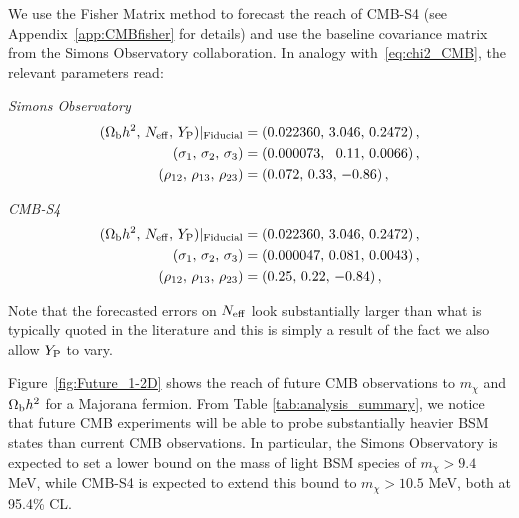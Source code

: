 \documentclass[notitlepage,letterpaper,natbib,aps,prd,onecolumn,amsmath,amsfonts,nofootinbib,preprintnumbers,superscriptaddress,secnumarabic,groupedaddress]{revtex4-1}
\begin{document}
We use the Fisher Matrix method to forecast the reach of CMB-S4 (see Appendix~\ref{app:CMBfisher} for details) and use the baseline covariance matrix from the Simons Observatory collaboration. In analogy with~\eqref{eq:chi2_CMB}, the relevant parameters read:

\begin{center}
\begin{minipage}{0.49\textwidth}
\centering \textit{Simons Observatory}
\begin{align}
(\Omega_\mathrm{b} h^2,\,N_{\rm eff},\,Y_{\rm P})|_{\rm Fiducial} &= (0.022360,\, 3.046,\, 0.2472) \, \nonumber, \\
(\sigma_{1},\,\sigma_{2},\,\sigma_{3}) &= (0.000073,\, \,\,\,0.11,\, 0.0066)\, , \nonumber \\
(\rho_{12},\,\rho_{13},\,\rho_{23}) &= (0.072,\, 0.33,\, -0.86) \, ,\nonumber
\end{align}
\end{minipage}
\begin{minipage}{0.49\textwidth}
\centering \textit{CMB-S4}
\begin{align}
(\Omega_\mathrm{b} h^2,\,N_{\rm eff},\,Y_{\rm P})|_{\rm Fiducial} &= (0.022360,\, 3.046,\, 0.2472) \, , \nonumber  \\
(\sigma_{1},\,\sigma_{2},\,\sigma_{3}) &= (0.000047,\, 0.081,\, 0.0043)\,  ,\nonumber\\ 
(\rho_{12},\,\rho_{13},\,\rho_{23}) &= (0.25,\, 0.22,\, -0.84) \, ,\nonumber
\end{align}
\end{minipage}
\end{center}

Note that the forecasted errors on $N_{\rm eff}$ look substantially larger than what is typically quoted in the literature and this is simply a result of the fact we also allow $Y_{\rm P}$ to vary.

Figure~\ref{fig:Future_1-2D} shows the reach of future CMB observations to $m_\chi$ and $\Omega_{\rm b}h^2$ for a Majorana fermion. From Table \ref{tab:analysis_summary}, we notice that future CMB experiments will be able to probe substantially heavier BSM states than current CMB observations. In particular, the Simons Observatory is expected to set a lower bound on the mass of light BSM species of $m_\chi > 9.4$ MeV, while CMB-S4 is expected to extend this bound to $m_\chi > 10.5$ MeV, both at 95.4\% CL.
 
\end{document}
